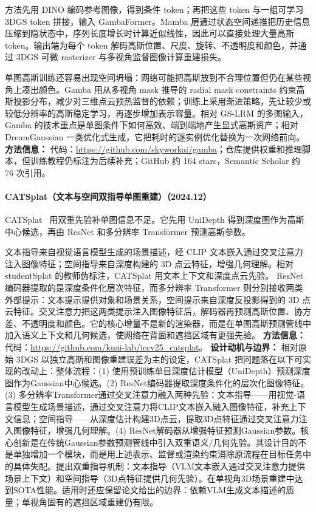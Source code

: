 方法先用 DINO 编码参考图像，得到条件 token；再把这些 token 与一组可学习 3DGS token 拼接，输入 GambaFormer。Mamba 层通过状态空间递推把历史信息压缩到隐状态中，序列长度增长时计算近似线性，因此可以直接处理大量高斯 token。输出端为每个 token 解码高斯位置、尺度、旋转、不透明度和颜色，并通过 3DGS 可微 rasterizer 与多视角监督图像计算重建损失。

单图高斯训练还容易出现空间坍塌：网络可能把高斯放到不合理位置但仍在某些视角上凑出颜色。Gamba 用从多视角 mask 推导的 radial mask constraints 约束高斯投影分布，减少对三维点云预热监督的依赖；训练上采用渐进策略，先让较少或较低分辨率的高斯稳定学习，再逐步增加表示容量。相对 GS-LRM 的多图输入，Gamba 的技术重点是单图条件下如何高效、端到端地产生显式高斯资产；相对 DreamGaussian 一类优化式生成，它把耗时的逐实例优化替换为一次网络前向。\textbf{方法信息：} 代码：\url{https://github.com/skyworkai/gamba}；仓库提供权重和推理脚本，但训练教程仍标注为后续补充；GitHub 约 164 stars，Semantic Scholar 约 76 次引用。



\paragraph{CATSplat（文本与空间双指导单图重建）（2024.12）}
CATSplat~\cite{2412_12906} 用双重先验补单图信息不足。它先用 UniDepth 得到深度图作为高斯中心候选，再由 ResNet 和多分辨率 Transformer 预测高斯参数。

文本指导来自视觉语言模型生成的场景描述，经 CLIP 文本嵌入通过交叉注意力注入图像特征；空间指导来自深度构建的 3D 点云特征，增强几何理解。相对 studentSplat 的教师伪标注，CATSplat 用文本上下文和深度点云先验。
ResNet 编码器提取的是深度条件化层次特征，而多分辨率 Transformer 则分别接收两类外部提示：文本提示提供对象和场景关系，空间提示来自深度反投影得到的 3D 点云特征。交叉注意力把这两类提示注入图像特征后，解码器再预测高斯位置、协方差、不透明度和颜色。它的核心增量不是新的渲染器，而是在单图高斯预测管线中加入语义上下文和几何候选，使网络在背面和遮挡区域有更强先验。
\textbf{方法信息：} 代码：\url{https://github.com/kuai-lab/iccv25_catsplat}。
\textbf{设计动机与边界：} 相对原始 3DGS 以独立高斯和图像重建误差为主的设定，CATSplat 把问题落在以下可实现的改动上：整体流程：(1) 使用预训练单目深度估计模型（UniDepth）预测深度图作为Gaussian中心候选。(2) ResNet编码器提取深度条件化的层次化图像特征。(3) 多分辨率Transformer通过交叉注意力融入两种先验：文本指导——用视觉-语言模型生成场景描述，通过交叉注意力将CLIP文本嵌入融入图像特征，补充上下文信息；空间指导——从深度估计构建3D点云，提取3D点特征通过交叉注意力注入图像特征，增强几何理解。(4) ResNet解码器从增强特征预测Gaussian参数。核心创新是在传统Gaussian参数预测管线中引入双重语义/几何先验。其设计目的不是单独增加一个模块，而是用上述表示、监督或渲染约束消除原流程在目标任务中的具体失配。提出双重指导机制：文本指导（VLM文本嵌入通过交叉注意力提供场景上下文）和空间指导（3D点特征提供几何先验）。在单视角3D场景重建中达到SOTA性能。适用时还应保留论文给出的边界：依赖VLM生成文本描述的质量；单视角固有的遮挡区域重建仍有限。
